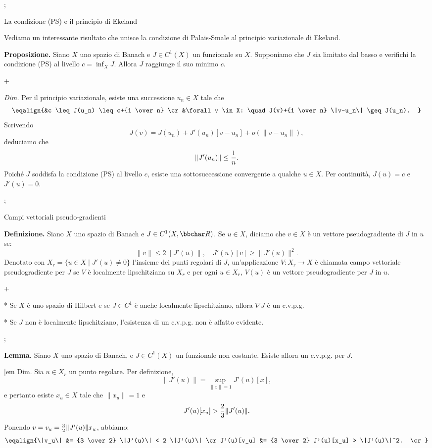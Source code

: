 \pg;

\sec La condizione (PS) e il principio di Ekeland

Vediamo un interessante risultato che unisce la condizione di Palais-Smale al principio variazionale di Ekeland.

\medskip

{\bf Proposizione.} Siano $X$ uno spazio di Banach e $J \in C^1(X)$ un
funzionale su $X$. Supponiamo che $J$ sia limitato dal basso e
verifichi la condizione (PS) al livello $c = \inf_X J$. Allora $J$
raggiunge il suo minimo $c$.

\pg+

{\em Dim.} Per il principio variazionale, esiste una successione $u_n
\in X$ tale che
$$
\eqalign{%
&c \leq J(u_n) \leq c+{1 \over n} \cr
&\forall v \in X: \quad J(v)+{1 \over n} \|v-u_n\| \geq J(u_n).
}
$$
Scrivendo
$$
J(v)=J(u_n)+J'(u_n)[v-u_n]+o(\|v-u_n\|),
$$
deduciamo che
$$
\|J'(u_n)\| \leq {1 \over n}.
$$
Poich\'e $J$ soddisfa la condizione (PS) al livello $c$, esiste una
sottosuccessione convergente a qualche $u \in X$. Per continuit\`a,
$J(u)=c$ e $J'(u)=0$.

\pg;

\sec Campi vettoriali pseudo-gradienti

{\bf Definizione.} Siano $X$ uno spazio di Banach e $J \in
C^1(X,\R)$. Se $u \in X$, diciamo che $v \in X$ \`e un vettore
pseudogradiente di $J$ in $u$ se:
$$
\|v\| \leq 2 \|J'(u)\|, \quad J'(u)[v] \geq \|J'(u)\|^2.
$$
Denotato con $X_r = \{u \in X \mid J'(u) \neq 0\}$ l'insieme dei punti
regolari di $J$, un'applicazione $V \colon X_r \to X$ \`e chiamata
campo vettoriale pseudogradiente per $J$ se $V$ \`e localmente
lipschitziana su $X_r$ e per ogni $u \in X_r$, $V(u)$ \`e un vettore
pseudogradiente per $J$ in $u$.

\pg+

* Se $X$ \`e uno spazio di Hilbert e se $J \in C^1$ \`e anche
  localmente lipschitziano, allora $\nabla J$ \`e un c.v.p.g.

* Se $J$ non \`e localmente lipschitziano, l'esistenza di un
  c.v.p.g. non \`e affatto evidente.

\pg;

{\bf Lemma.} Siano $X$ uno spazio di Banach, e $J \in C^1(X)$ un
funzionale non costante. Esiste allora un c.v.p.g. per $J$.

\smallskip

{|em Dim.} Sia $u \in X_r$ un punto regolare. Per definizione,
$$
\|J'(u) \| = \sup_{\|x\|=1} J'(u)[x],
$$
e pertanto esiste $x_u \in X$ tale che $\|x_u\|=1$ e
$$
J'(u)[x_u] > {2 \over 3} \|J'(u)\|.
$$
Ponendo $v=v_u={3 \over 2} \|J'(u)\|x_u$, abbiamo:
$$
\eqalign{%
\|v_u\| &= {3 \over 2} \|J'(u)\| < 2 \|J'(u)\| \cr
J'(u)[v_u] &= {3 \over 2} J'(u)[x_u] > \|J'(u)\|^2. \cr
}
$$

